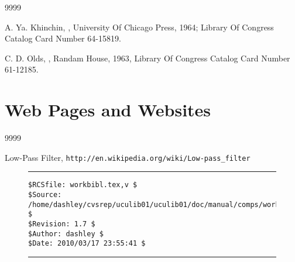 \begin{thecustombibliography}{9999}

A. Ya. Khinchin, 
, University Of
Chicago Press, 1964; Library Of Congress Catalog Card
Number 64-15819.

C. D. Olds,
,
Randam House, 1963,
Library Of Congress Catalog Card Number 61-12185.

\end{thecustombibliography}


\section*{Web Pages and Websites}

\begin{thecustombibliography}{9999}

Low-Pass Filter,
\texttt{http://en.wikipedia.org/wiki/Low-pass\_filter}

\end{thecustombibliography}



\noindent\begin{figure}[!b]
\noindent\rule[-0.25in]{\textwidth}{1pt}
\begin{tiny}
\begin{verbatim}
$RCSfile: workbibl.tex,v $
$Source: /home/dashley/cvsrep/uculib01/uculib01/doc/manual/comps/workbibl.tex,v $
$Revision: 1.7 $
$Author: dashley $
$Date: 2010/03/17 23:55:41 $
\end{verbatim}
\end{tiny}
\noindent\rule[0.25in]{\textwidth}{1pt}
\end{figure}

%
%
%
%
%
%
%
